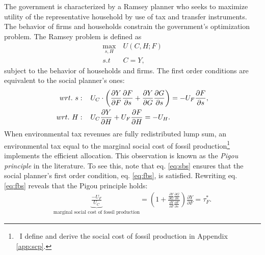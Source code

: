 The government is characterized by a Ramsey planner who seeks to maximize utility of the representative household by use of tax and transfer instruments. The behavior of firms and households constrain the government's optimization problem. 
The Ramsey problem is defined as
\begin{align*}
\underset{s, H}{\max}\ & U(C,H; F)\\ s.t\ \ &  C=Y,
\end{align*}
subject to the behavior of households and firms.
The first order conditions are equivalent to the social planner's ones:
\begin{align}
wrt.\ s:\hspace{4mm} & U_C\cdot\left(\frac{\partial Y}{\partial F}\frac{\partial F}{\partial s}+\frac{\partial Y}{\partial G}\frac{\partial G}{\partial s}\right)=-U_F\frac{\partial F}{\partial s}, \label{eq:sbs}
\\
wrt.\ H:\hspace{4mm} & U_C\frac{\partial Y}{\partial H}+U_F\frac{\partial F}{\partial H}=-U_H\label{eq:sbh}. 
\end{align}
When environmental tax revenues are fully redistributed lump sum, an environmental tax equal to the marginal social cost of fossil production\footnote{\ I define and derive the social cost of fossil production in Appendix \ref{app:scp}.} implements the efficient allocation. This observation is known as the \textit{Pigou principle} in the literature. 
To see this, note that eq. \eqref{eq:sbs} ensures that the social planner's first order condition, eq. \eqref{eq:fbs}, is satisfied. 
Rewriting eq. \eqref{eq:fbs} reveals that the Pigou principle holds: %
\begin{align*}
\underbrace{\frac{-U_F}{U_C}}_{\text{marginal social cost of fossil production}}=\left(1+\frac{\frac{\partial Y}{\partial G}\frac{\partial G}{\partial s}}{\frac{\partial Y}{\partial F}\frac{\partial F}{\partial s}}\right)\frac{\partial Y}{\partial F}=\tau^*_F.
\end{align*}
